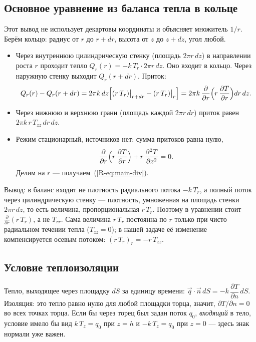 \documentclass[a4paper,12pt]{article}
\newcommand{\rf}[1]{(\ref*{R-#1})}
\newcommand{\pd}[2]{\dfrac{\partial #1}{\partial #2}}
\newcommand{\pdd}[2]{\dfrac{\partial^2 #1}{\partial #2^2}}
\begin{document}
\subsection{Основное уравнение из баланса тепла в кольце}
\label{der:ring}
Этот вывод не использует декартовы координаты и объясняет множитель $1/r$.
Берём кольцо: радиус от $r$ до $r+dr$, высота от $z$ до $z+dz$, угол любой.
\begin{itemize}
  \item Через внутреннюю цилиндрическую стенку (площадь $2\pi r\,dz$)
  в направлении роста $r$ проходит тепло $Q_r(r)=-k\,T_r\cdot2\pi r\,dz$.
  Оно входит в кольцо. Через наружную стенку выходит $Q_r(r+dr)$. Приток:
  \[
  Q_r(r)-Q_r(r+dr)=2\pi k\,dz\Bigl[(r\,T_r)\big|_{r+dr}-(r\,T_r)\big|_{r}\Bigr]
  =2\pi k\,\pd{}{r}\Bigl(r\,\pd{T}{r}\Bigr)dr\,dz .
  \]
  \item Через нижнюю и верхнюю грани (площадь каждой $2\pi r\,dr$) приток
  равен $2\pi k\,r\,T_{zz}\,dr\,dz$.
  \item Режим стационарный, источников нет: сумма притоков равна нулю,
  \[
  \pd{}{r}\Bigl(r\,\pd{T}{r}\Bigr)+r\,\pdd{T}{z}=0 .
  \]
  Делим на $r$ — получаем~\rf{eq:main-div}.
\end{itemize}
Вывод: в баланс входит не плотность радиального потока $-k\,T_r$, а полный
поток через цилиндрическую стенку — плотность, умноженная на площадь стенки
$2\pi r\,dz$, то есть величина, пропорциональная $r\,T_r$. Поэтому
в уравнении стоит $\frac{\partial}{\partial r}(r\,T_r)$, а не $T_{rr}$.
Сама величина $r\,T_r$ постоянна по $r$ только при чисто радиальном течении
тепла ($T_{zz}=0$); в нашей задаче её изменение компенсируется осевым
потоком: $(r\,T_r)_r=-r\,T_{zz}$.

\subsection{Условие теплоизоляции}
\label{der:ins}
Тепло, выходящее через площадку $dS$ за единицу времени:
$\vec q\cdot\vec n\,dS=-k\,\dfrac{\partial T}{\partial n}\,dS$.
Изоляция: это тепло равно нулю для любой площадки торца, значит,
$\partial T/\partial n=0$ во всех точках торца. Если бы через торец был
задан поток $q_0$, \emph{входящий} в тело, условие имело бы вид
$k\,T_z=q_0$ при $z=h$ и $-k\,T_z=q_0$ при $z=0$ — здесь знак нормали уже
важен.
\end{document}
